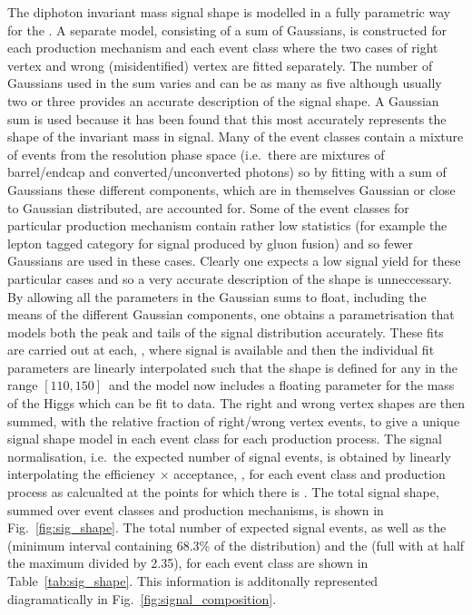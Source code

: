 The diphoton invariant mass signal shape is modelled in a fully parametric way for the \MFM. A separate model, consisting of a sum of Gaussians, is constructed for each production mechanism and each event class where the two cases of right vertex and wrong (misidentified) vertex are fitted separately. The number of Gaussians used in the sum varies and can be as many as five although usually two or three provides an accurate description of the signal shape. A Gaussian sum is used because it has been found that this most accurately represents the shape of the invariant mass in signal. Many of the event classes contain a mixture of events from the resolution phase space (i.e.~there are mixtures of barrel/endcap and converted/unconverted photons) so by fitting with a sum of Gaussians these different components, which are in themselves Gaussian or close to Gaussian distributed, are accounted for. Some of the event classes for particular production mechanism contain rather low \MC statistics (for example the lepton tagged category for signal produced by gluon fusion) and so fewer Gaussians are used in these cases. Clearly one expects a low signal yield for these particular cases and so a very accurate description of the shape is unneccessary. By allowing all the parameters in the Gaussian sums to float, including the means of the different Gaussian components, one obtains a parametrisation that models both the peak and tails of the signal distribution accurately. These fits are carried out at each, \mH, where signal \MC is available and then the individual fit parameters are linearly interpolated such that the shape is defined for any \mH in the range $[110,150]$~\GeV and the model now includes a floating parameter for the mass of the Higgs which can be fit to data. The right and wrong vertex shapes are then summed, with the relative fraction of right/wrong vertex events, to give a unique signal shape model in each event class for each production process. The signal normalisation, i.e.~the expected number of \SM signal events, is obtained by linearly interpolating the efficiency $\times$ acceptance, \ea, for each event class and production process as calcualted at the \mH points for which there is \MC. The total signal shape, summed over event classes and production mechanisms, is shown in Fig.~\ref{fig:sig_shape}. The total number of expected signal events, as well as the \sigeff (minimum interval containing 68.3\% of the distribution) and the \sigFW (full with at half the maximum divided by 2.35), for each event class are shown in Table~\ref{tab:sig_shape}. This information is additonally represented diagramatically in Fig.~\ref{fig:signal_composition}.

